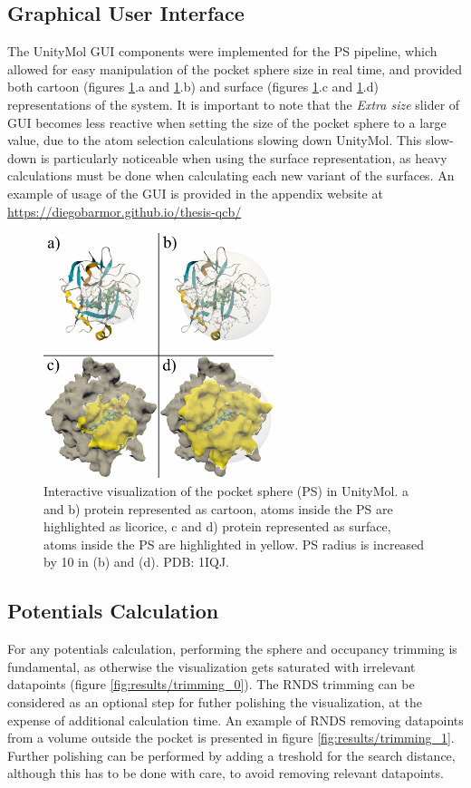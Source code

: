   \subsection{Graphical User Interface}
    The UnityMol GUI components were implemented for the PS pipeline, which allowed for easy manipulation of the pocket sphere size in real time, and provided both cartoon (figures \ref{fig:results/gui_sphere}.a and \ref{fig:results/gui_sphere}.b) and surface (figures \ref{fig:results/gui_sphere}.c and \ref{fig:results/gui_sphere}.d) representations of the system. It is important to note that the \textit{Extra size} slider of GUI becomes less reactive when setting the size of the pocket sphere to a large value, due to the atom selection calculations slowing down UnityMol. This slow-down is particularly noticeable when using the surface representation, as heavy calculations must be done when calculating each new variant of the surfaces. An example of usage of the GUI is provided in the appendix website at \url{https://diegobarmor.github.io/thesis-qcb/}

    \begin{figure}[H]
      \centering
      \includegraphics[width=0.6\textwidth]{figures/results/gui_sphere.png}
      \caption{\label{fig:results/gui_sphere} Interactive visualization of the pocket sphere (PS) in UnityMol. a and b) protein represented as cartoon, atoms inside the PS are highlighted as licorice, c and d) protein represented as surface, atoms inside the PS are highlighted in yellow. PS radius is increased by 10 in (b) and (d). PDB: 1IQJ.}
    \end{figure}

  \subsection{Potentials Calculation}
    For any potentials calculation, performing the sphere and occupancy trimming is fundamental, as otherwise the visualization gets saturated with irrelevant datapoints (figure \ref{fig:results/trimming_0}). The RNDS trimming can be considered as an optional step for futher polishing the visualization, at the expense of additional calculation time. An example of RNDS removing datapoints from a volume outside the pocket is presented in figure \ref{fig:results/trimming_1}. Further polishing can be performed by adding a treshold for the search distance, although this has to be done with care, to avoid removing relevant datapoints.

